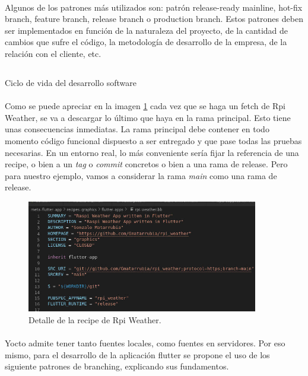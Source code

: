 \paragraph{}Algunos de los patrones más utilizados son: patrón release-ready mainline,
hot-fix branch, feature branch, release branch o production branch. Estos patrones deben
ser implementados en función de la naturaleza del proyecto, de la cantidad de cambios que
sufre el código, la metodología de desarrollo de la empresa, de la relación con el
cliente, etc.

\subsection{} Ciclo de vida del desarrollo software

\paragraph{}Como se puede apreciar en la imagen \ref{imgs:recipe-rpi-weather-1} cada
vez que se haga un \gls{fetch} de Rpi Weather, se va a descargar lo último que haya en la
rama principal. Esto tiene unas consecuencias inmediatas. La rama principal debe contener
en todo momento código funcional dispuesto a ser entregado y que pase todas las pruebas
necesarias. En un entorno real, lo más conveniente sería fijar la referencia de una recipe,
o bien a un \emph{tag} o \emph{commit} concretos o bien a una rama de release. Pero para
nuestro ejemplo, vamos a considerar la rama \emph{main} como una rama de release.

\begin{figure}[H]
    \centering
    \includegraphics[width=0.90\textwidth]{imgs/rpi-weather-recipe}
    \caption[Detale recipe de Rpi Weahter]{Detalle de la recipe de Rpi Weather.}
    \label{imgs:recipe-rpi-weather-1}
\end{figure}

\paragraph{}Yocto admite tener tanto fuentes locales, como fuentes en servidores. Por
eso mismo, para el desarrollo de la aplicación flutter se propone el uso de los
siguiente patrones de branching, explicando sus fundamentos.

